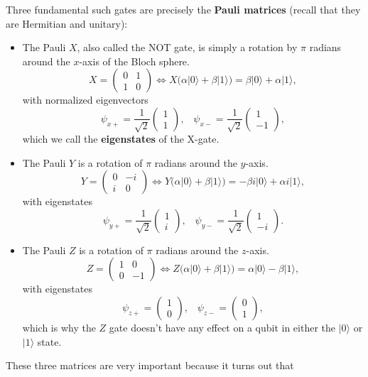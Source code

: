 \documentclass{article}
\theoremstyle{definition}
\begin{document}
Three fundamental such gates are precisely the \textbf{Pauli matrices} (recall that they are Hermitian and unitary):
\begin{itemize}
  \item The Pauli $X$, also called the NOT gate, is simply a rotation by $\pi$ radians around the $x$-axis of the Bloch sphere.
    \[X = \begin{pmatrix} 0 & 1 \\ 1 & 0 \end{pmatrix} \iff X \big(\alpha |0\rangle + \beta |1 \rangle \big) = \beta |0\rangle + \alpha |1\rangle,\]
    with normalized eigenvectors
    \[\psi_{x+} = \frac{1}{\sqrt{2}} \begin{pmatrix} 1 \\ 1 \end{pmatrix}, \;\;\; \psi_{x-} = \frac{1}{\sqrt{2}} \begin{pmatrix} 1 \\ -1 \end{pmatrix},\]
    which we call the \textbf{eigenstates} of the X-gate.
  \item The Pauli $Y$ is a rotation of $\pi$ radians around the $y$-axis.
    \[Y = \begin{pmatrix} 0 & -i \\ i & 0 \end{pmatrix} \iff Y \big( \alpha |0\rangle + \beta |1 \rangle \big) = -\beta i |0\rangle + \alpha i |1 \rangle,\]
    with eigenstates
    \[\psi_{y+} = \frac{1}{\sqrt{2}} \begin{pmatrix} 1 \\ i \end{pmatrix}, \;\;\; \psi_{y-} = \frac{1}{\sqrt{2}} \begin{pmatrix} 1 \\ -i \end{pmatrix}.\]
  \item The Pauli $Z$ is a rotation of $\pi$ radians around the $z$-axis.
    \[Z = \begin{pmatrix} 1 & 0 \\ 0 & -1 \end{pmatrix} \iff Z \big( \alpha |0\rangle + \beta | 1 \rangle \big) = \alpha |0 \rangle - \beta |1 \rangle,\]
    with eigenstates
    \[\psi_{z+} = \begin{pmatrix} 1 \\ 0 \end{pmatrix}, \;\;\; \psi_{z-} = \begin{pmatrix} 0 \\ 1 \end{pmatrix},\]
    which is why the $Z$ gate doesn't have any effect on a qubit in either the $|0\rangle$ or $|1\rangle$ state.
\end{itemize}
These three matrices are very important because it turns out that
\end{document}
